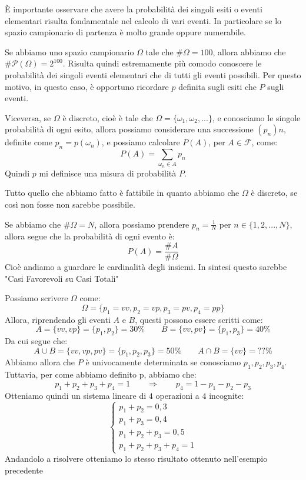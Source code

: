 \documentclass[11pt, a4paper, twoside]{article}
\begin{document}
È importante osservare che avere la probabilità dei singoli esiti o eventi elementari risulta fondamentale nel calcolo di vari eventi. In particolare se lo spazio campionario di partenza è molto grande oppure numerabile.

\begin{es}
	Se abbiamo uno spazio campionario $\Omega$ tale che $\# \Omega = 100$, allora abbiamo che $\# \mathcal P(\Omega) = 2^{100}$.
	Risulta quindi estremamente più comodo conoscere le probabilità dei singoli eventi elementari che di tutti gli eventi possibili.
	Per questo motivo, in questo caso, è opportuno ricordare $p$ definita sugli esiti che $P$ sugli eventi.

	Viceversa, se $\Omega$ è discreto, cioè è tale che $\Omega = \{\omega_1,\omega_2,...\}$, e conosciamo le singole probabilità di ogni esito, allora possiamo considerare una successione $(p_n)n$, definite come $p_n = p(\omega_n)$, e possiamo calcolare $P(A)$, per $A \in \mathcal F$, come:
	\[ P(A) = \sum_{\omega_n \in A}p_n \]
	Quindi $p$ mi definisce una misura di probabilità $P$.
\end{es}

Tutto quello che abbiamo fatto è fattibile in quanto abbiamo che $\Omega$ è discreto, se così non fosse non sarebbe possibile.

\begin{es}
	Se abbiamo che $\# \Omega = N$, allora possiamo prendere $p_n = \frac 1N$ per $n \in \{1,2,...,N\}$, allora segue che la probabilità di ogni evento è:
	\[ P(A) = \frac{\# A}{\# \Omega} \]
	Cioè andiamo a guardare le cardinalità degli insiemi. In sintesi questo sarebbe "Casi Favorevoli su Casi Totali"
\end{es}

\begin{es} %
	Possiamo scrivere $\Omega$ come:
	\[ \Omega = \{ p_1 = vv, p_2 = vp, p_3 = pv, p_4 = pp \} \]
	Allora, riprendendo gli eventi $A$ e $B$, questi possono essere scritti come:
	\[ A = \{ vv, vp \} = \{p_1,p_2\} = 30\% \qquad B = \{ vv, pv \} = \{p_1,p_3\} = 40\% \]
	Da cui segue che:
	\[ A\cup B = \{vv,vp,pv\} = \{p_1,p_2,p_3\} = 50\% \qquad A \cap B = \{ vv \}=\mathbf{??}\% \]
	Abbiamo allora che $P$ è univocamente determinata se conosciamo $p_1,p_2,p_3,p_4$. Tuttavia, per come abbiamo definito p, abbiamo che:
	\[ p_1+p_2+p_3+p_4 = 1 \qquad \Rightarrow \qquad p_4 = 1-p_1-p_2-p_3 \]
	Otteniamo quindi un sistema lineare di $4$ operazioni a $4$ incognite:
	\[
		\begin{cases}
			p_1 + p_2 = 0,3\\
			p_1 + p_3 = 0,4\\
			p_1 + p_2 + p_3 = 0,5\\
			p_1 + p_2 + p_3 + p_4 = 1
		\end{cases}
	\]
	Andandolo a risolvere otteniamo lo stesso risultato ottenuto nell'esempio precedente
\end{es}
\end{document}
